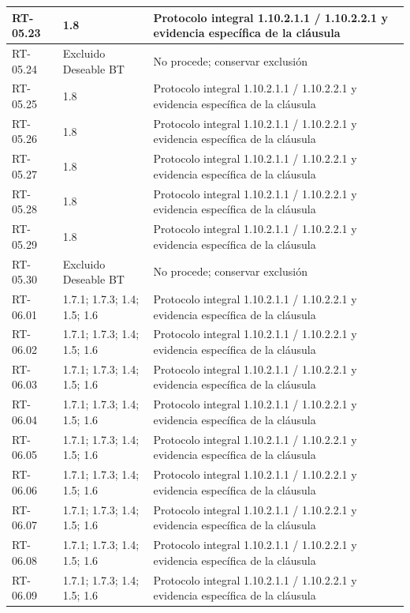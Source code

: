 \begin{longtable}{L{23mm}L{46mm}L{72mm}}
RT-05.23 & 1.8 & Protocolo integral 1.10.2.1.1 / 1.10.2.2.1 y evidencia específica de la cláusula\\\hline
RT-05.24 & Excluido Deseable BT & No procede; conservar exclusión\\\hline
RT-05.25 & 1.8 & Protocolo integral 1.10.2.1.1 / 1.10.2.2.1 y evidencia específica de la cláusula\\\hline
RT-05.26 & 1.8 & Protocolo integral 1.10.2.1.1 / 1.10.2.2.1 y evidencia específica de la cláusula\\\hline
RT-05.27 & 1.8 & Protocolo integral 1.10.2.1.1 / 1.10.2.2.1 y evidencia específica de la cláusula\\\hline
RT-05.28 & 1.8 & Protocolo integral 1.10.2.1.1 / 1.10.2.2.1 y evidencia específica de la cláusula\\\hline
RT-05.29 & 1.8 & Protocolo integral 1.10.2.1.1 / 1.10.2.2.1 y evidencia específica de la cláusula\\\hline
RT-05.30 & Excluido Deseable BT & No procede; conservar exclusión\\\hline
RT-06.01 & 1.7.1; 1.7.3; 1.4; 1.5; 1.6 & Protocolo integral 1.10.2.1.1 / 1.10.2.2.1 y evidencia específica de la cláusula\\\hline
RT-06.02 & 1.7.1; 1.7.3; 1.4; 1.5; 1.6 & Protocolo integral 1.10.2.1.1 / 1.10.2.2.1 y evidencia específica de la cláusula\\\hline
RT-06.03 & 1.7.1; 1.7.3; 1.4; 1.5; 1.6 & Protocolo integral 1.10.2.1.1 / 1.10.2.2.1 y evidencia específica de la cláusula\\\hline
RT-06.04 & 1.7.1; 1.7.3; 1.4; 1.5; 1.6 & Protocolo integral 1.10.2.1.1 / 1.10.2.2.1 y evidencia específica de la cláusula\\\hline
RT-06.05 & 1.7.1; 1.7.3; 1.4; 1.5; 1.6 & Protocolo integral 1.10.2.1.1 / 1.10.2.2.1 y evidencia específica de la cláusula\\\hline
RT-06.06 & 1.7.1; 1.7.3; 1.4; 1.5; 1.6 & Protocolo integral 1.10.2.1.1 / 1.10.2.2.1 y evidencia específica de la cláusula\\\hline
RT-06.07 & 1.7.1; 1.7.3; 1.4; 1.5; 1.6 & Protocolo integral 1.10.2.1.1 / 1.10.2.2.1 y evidencia específica de la cláusula\\\hline
RT-06.08 & 1.7.1; 1.7.3; 1.4; 1.5; 1.6 & Protocolo integral 1.10.2.1.1 / 1.10.2.2.1 y evidencia específica de la cláusula\\\hline
RT-06.09 & 1.7.1; 1.7.3; 1.4; 1.5; 1.6 & Protocolo integral 1.10.2.1.1 / 1.10.2.2.1 y evidencia específica de la cláusula\\\hline

\end{longtable}
